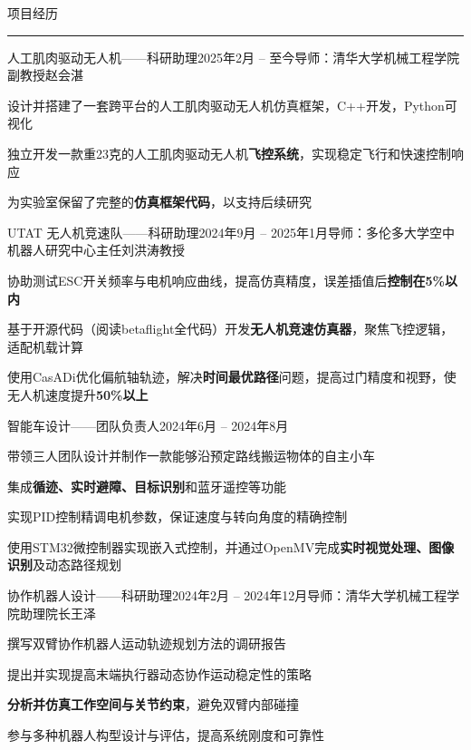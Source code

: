 \documentclass{resume} %
\renewenvironment{rSection}[1]{
\sectionskip
\textcolor{TsinghuaPurple}{\MakeUppercase{#1}}
\sectionlineskip
\hrule
\begin{list}{}{
\setlength{\leftmargin}{0em}
}
\item[]
}{
\end{list}
}
\begin{document}
\begin{rSection}{项目经历}

\begin{rSubsection}{人工肌肉驱动无人机——科研助理}{2025年2月 -- 至今}{导师：清华大学机械工程学院副教授赵会湛}{}
    \item 设计并搭建了一套跨平台的人工肌肉驱动无人机仿真框架，C++开发，Python可视化
    \item 独立开发一款重23克的人工肌肉驱动无人机\textbf{飞控系统}，实现稳定飞行和快速控制响应
    \item 为实验室保留了完整的\textbf{仿真框架代码}，以支持后续研究
\end{rSubsection}

\begin{rSubsection}{UTAT 无人机竞速队——科研助理}{2024年9月 -- 2025年1月}{导师：多伦多大学空中机器人研究中心主任刘洪涛教授}{}    
    \item 协助测试ESC开关频率与电机响应曲线，提高仿真精度，误差插值后\textbf{控制在5\%以内}
    \item 基于开源代码（阅读betaflight全代码）开发\textbf{无人机竞速仿真器}，聚焦飞控逻辑，适配机载计算
    \item 使用CasADi优化偏航轴轨迹，解决\textbf{时间最优路径}问题，提高过门精度和视野，使无人机速度提升\textbf{50\%以上}
\end{rSubsection}

\begin{rSubsection}{智能车设计——团队负责人}{2024年6月 -- 2024年8月}{}{}
\item 带领三人团队设计并制作一款能够沿预定路线搬运物体的自主小车
\item 集成\textbf{循迹、实时避障、目标识别}和蓝牙遥控等功能
\item 实现PID控制精调电机参数，保证速度与转向角度的精确控制
\item 使用STM32微控制器实现嵌入式控制，并通过OpenMV完成\textbf{实时视觉处理、图像识别}及动态路径规划
\end{rSubsection}

\newpage

\begin{rSubsection}{协作机器人设计——科研助理}{2024年2月 -- 2024年12月}{导师：清华大学机械工程学院助理院长王泽}{}
    \item 撰写双臂协作机器人运动轨迹规划方法的调研报告
    \item 提出并实现提高末端执行器动态协作运动稳定性的策略
    \item \textbf{分析并仿真工作空间与关节约束}，避免双臂内部碰撞
    \item 参与多种机器人构型设计与评估，提高系统刚度和可靠性
\end{rSubsection}

\end{rSection}
\end{document}
